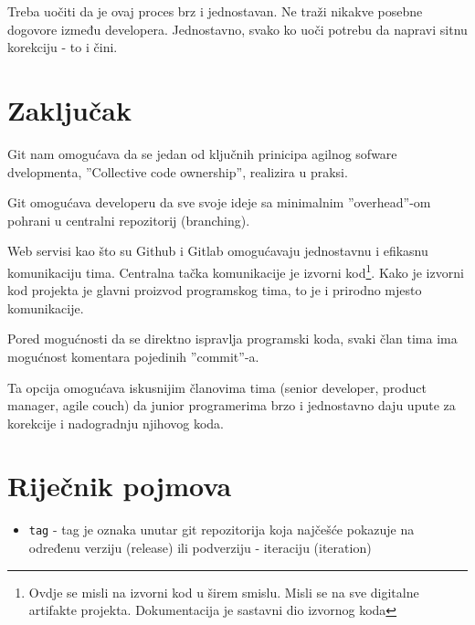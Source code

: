 \documentclass[times, utf8, seminar]{fit}
\begin{document}
\begin{itemize}
Treba uočiti da je ovaj proces brz i jednostavan. Ne traži nikakve posebne dogovore između developera.
Jednostavno, svako ko uoči potrebu da napravi sitnu korekciju - to i čini.

\chapter{Zaključak}

Git nam omogućava da se jedan od ključnih prinicipa agilnog sofware dvelopmenta, ''Collective code ownership'', realizira u praksi.

Git omogućava developeru da sve svoje ideje sa minimalnim ''overhead''-om pohrani u centralni repozitorij (branching).

Web servisi kao što su Github i Gitlab omogućavaju jednostavnu i efikasnu komunikaciju tima. Centralna tačka komunikacije je izvorni kod\footnote{Ovdje se misli na izvorni kod u širem smislu. Misli se na sve digitalne artifakte projekta. Dokumentacija je sastavni dio izvornog koda}.
Kako je izvorni kod projekta je glavni proizvod programskog tima, to je i prirodno mjesto komunikacije.

Pored mogućnosti da se direktno ispravlja programski koda, svaki član tima ima mogućnost komentara pojedinih ''commit''-a.

Ta opcija omogućava iskusnijim članovima tima (senior developer, product manager, agile couch) da junior programerima brzo i jednostavno daju upute za korekcije i nadogradnju njihovog koda.







\appendix

\chapter{Riječnik pojmova}

\begin{itemize}
    \item \texttt{tag} - tag je oznaka unutar git repozitorija koja najčešće pokazuje na određenu verziju (release) ili podverziju - iteraciju (iteration)


\end{itemize}
\end{itemize}
\end{document}
